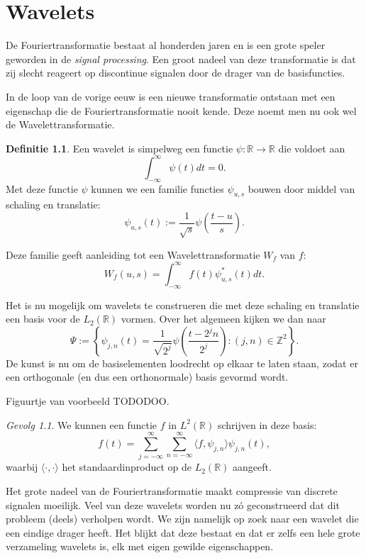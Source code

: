 \documentclass[11pt]{report}
\theoremstyle{plain}
\theoremstyle{definition}
\newtheorem{definitie}{Definitie}
\theoremstyle{remark}
\newtheorem*{gevolg}{Gevolg}
\newcommand{\R}{\mathbb{R}}
\newcommand{\Z}{\mathbb{Z}}
\begin{document}
\tableofcontents

\chapter{Wavelets}
De Fouriertransformatie bestaat al honderden jaren en is een grote speler geworden in de \emph{signal processing}. Een groot nadeel van deze transformatie is dat zij slecht reageert op discontinue signalen door de drager van de basisfuncties.

In de loop van de vorige eeuw is een nieuwe transformatie ontstaan met een eigenschap die de Fouriertransformatie nooit kende. Deze noemt men nu ook wel de Wavelettransformatie.

\begin{definitie}
Een wavelet is simpelweg een functie $\psi: \R \to \R$ die voldoet aan
\[
  \int_{-\infty}^{\infty} \psi(t) dt = 0.
\]
Met deze functie $\psi$ kunnen we een familie functies $\psi_{u,s}$ bouwen door middel van schaling en translatie:
\[
  \psi_{u,s}(t) := \frac{1}{\sqrt{s}} \psi\left(\frac{t-u}{s}\right).
\]
\end{definitie}

Deze familie geeft aanleiding tot een Wavelettransformatie $W_f$ van $f$:
\[
  W_f(u,s) = \int_{-\infty}^\infty f(t) \psi^*_{u,s}(t) dt.
\]

Het is nu mogelijk om wavelets te construeren die met deze schaling en translatie een basis voor de $L_2(\R)$ vormen. Over het algemeen kijken we dan naar
\[
  \Psi := \left\{ \psi_{j,n}(t) = \frac{1}{\sqrt{2^j}} \psi\left( \frac{t - 2^jn}{2^j}\right) : (j,n) \in \Z^2 \right\}.
\]
De kunst is nu om de basiselementen loodrecht op elkaar te laten staan, zodat er een orthogonale (en dus een orthonormale) basis gevormd wordt. 

Figuurtje van voorbeeld TODODOO.

\begin{gevolg}We kunnen een functie $f$ in $L^2(\R)$ schrijven in deze basis:
\[
  f(t) = \sum_{j=-\infty}^{\infty} \sum_{n=-\infty}^{\infty} \langle f, \psi_{j,n} \rangle \psi_{j,n}(t),
\]
waarbij $\langle \cdot, \cdot \rangle$ het standaardinproduct op de $L_2(\R)$ aangeeft.
\end{gevolg}

Het grote nadeel van de Fouriertransformatie maakt compressie van discrete signalen moeilijk. Veel van deze wavelets worden nu z\'o geconstrueerd dat dit probleem (deels) verholpen wordt. We zijn namelijk op zoek naar een wavelet die een eindige drager heeft. Het blijkt dat deze bestaat en dat er zelfs een hele grote verzameling wavelets is, elk met eigen gewilde eigenschappen.
\end{document}
